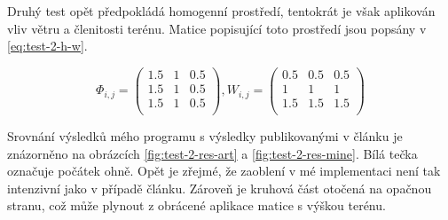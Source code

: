 \documentclass[11pt,a4paper]{scrartcl}
\begin{document}
	Druhý test opět předpokládá homogenní prostředí, tentokrát je však aplikován vliv větru a členitosti terénu. Matice popisující toto prostředí jsou popsány v \ref{eq:test-2-h-w}.
	
	\begin{equation}
	\Phi_{i,j} =
	\begin{pmatrix}
	1.5       & 1 & 0.5 \\
	1.5       & 1 & 0.5 \\
	1.5       & 1 & 0.5 \\
	\end{pmatrix}, 
	W_{i,j} = 
	\begin{pmatrix}
	0.5       & 0.5 & 0.5 \\
	1       & 1 & 1 \\
	1.5       & 1.5 & 1.5 \\	
	\end{pmatrix}
	\label{eq:test-2-h-w}
	\end{equation}
	
	Srovnání výsledků mého programu s výsledky publikovanými v článku je znázorněno na obrázcích \ref{fig:test-2-res-art} a \ref{fig:test-2-res-mine}. Bílá tečka označuje počátek ohně. Opět je zřejmé, že zaoblení v mé implementaci není tak intenzivní jako v případě článku. Zároveň je kruhová část otočená na opačnou stranu, což může plynout z obrácené aplikace matice s výškou terénu.
	
\end{document}
